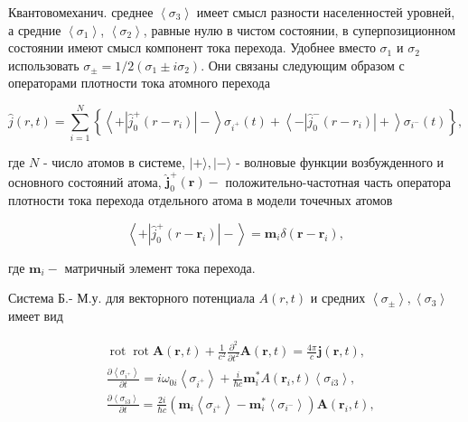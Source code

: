 \documentclass[10pt]{article}
\begin{document}
Квантовомеханич. среднее $\left\langle\sigma_{3}\right\rangle$ имеет смысл разности населенностей уровней, а средние $\left\langle\sigma_{1}\right\rangle$, $\left\langle\sigma_{2}\right\rangle$, равные нулю в чистом состоянии, в суперпозиционном состоянии имеют смысл компонент тока перехода. Удобнее вместо $\sigma_{1}$ и $\sigma_{2}$ использовать $\sigma_{ \pm}=1 / 2\left(\sigma_{1} \pm i \sigma_{2}\right)$. Они связаны следующим образом с операторами плотности тока атомного перехода



\[

\hat{j}(r, t)=\sum_{i=1}^{N}\left\{\left\langle+\left|\hat{j}_{0}^{+}\left(r-r_{i}\right)\right|-\right\rangle \sigma_{i^{+}}(t)+\left\langle-\left|\hat{j}_{0}^{-}\left(r-r_{i}\right)\right|+\right\rangle \sigma_{i^{-}}(t)\right\},

\]



где $N$ - число атомов в системе, $|+\rangle,|-\rangle$ - волновые функции возбужденного и основного состояний атома, $\hat{\boldsymbol{j}}_{0}^{+}(\boldsymbol{r})-$ положительно-частотная часть оператора плотности тока перехода отдельного атома в модели точечных атомов



\[

\left\langle+\left|\hat{j}_{0}^{+}\left(r-\boldsymbol{r}_{i}\right)\right|-\right\rangle=\boldsymbol{m}_{i} \delta\left(\boldsymbol{r}-\boldsymbol{r}_{i}\right),

\]



где $\boldsymbol{m}_{i}-$ матричный элемент тока перехода.



Система Б.- М.у. для векторного потенциала $A(r, t)$ и средних $\left\langle\sigma_{ \pm}\right\rangle,\left\langle\sigma_{3}\right\rangle$ имеет вид



\[

\begin{aligned}

& \operatorname{rot} \operatorname{rot} \boldsymbol{A}(\boldsymbol{r}, t)+\frac{1}{c^{2}} \frac{\partial^{2}}{\partial t^{2}} \boldsymbol{A}(\boldsymbol{r}, t)=\frac{4 \pi}{c} \boldsymbol{j}(\boldsymbol{r}, t), \\

& \frac{\partial\left\langle\sigma_{i^{+}}\right\rangle}{\partial t}=i \omega_{0 i}\left\langle\sigma_{i^{+}}\right\rangle+\frac{i}{\hbar c} \boldsymbol{m}_{i}^{*} A\left(\boldsymbol{r}_{i}, t\right)\left\langle\sigma_{i 3}\right\rangle, \\

& \frac{\partial\left\langle\sigma_{i 3}\right\rangle}{\partial t}=\frac{2 i}{\hbar c}\left(\boldsymbol{m}_{i}\left\langle\sigma_{i^{+}}\right\rangle-\boldsymbol{m}_{i}^{*}\left\langle\sigma_{i^{-}}\right\rangle\right) \boldsymbol{A}\left(\boldsymbol{r}_{i}, t\right),

\end{aligned}

\]
\end{document}
